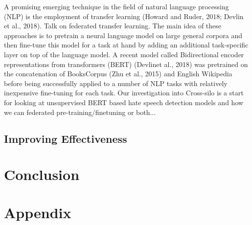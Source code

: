 \documentclass[letterpaper]{article} %
\begin{document}
A promising emerging technique in the field of natural language processing (NLP) is the employment of transfer learning (Howard and Ruder, 2018; Devlin et al., 2018). Talk on federated transfer learning. The main idea of these approaches is to pretrain a neural language model on large general corpora and then fine-tune this model for a task at hand by adding an additional task-specific layer on top of the language model. A recent model called Bidirectional encoder representations from transformers (BERT) (Devlinet al., 2018) was pretrained on the concatenation of BooksCorpus (Zhu et al., 2015) and English Wikipedia before being successfully applied to a number of NLP tasks with relatively inexpensive fine-tuning for each task. Our investigation into Cross-silo is a start for looking at unsupervised BERT based hate speech detection models and how we can federated pre-training/finetuning or both...

\subsection{Improving Effectiveness}

\bigskip
\section{Conclusion}
\bigskip

\clearpage
\section{Appendix}
\end{document}
